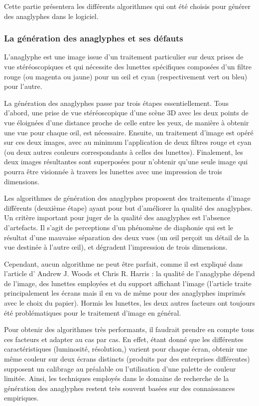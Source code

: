 Cette partie présentera les différents algorithmes qui ont été choisis pour générer des anaglyphes dans le logiciel.

\subsubsection{La génération des anaglyphes et ses défauts}
	L'anaglyphe est une image issue d'un traitement particulier sur deux prises de vue stéréoscopiques et qui nécessite des lunettes spécifiques composées d'un filtre rouge (ou magenta ou jaune) pour un \oe il et cyan (respectivement vert ou bleu) pour l'autre. 
	
	La génération des anaglyphes passe par trois étapes essentiellement. Tous d'abord, une prise de vue stéréoscopique d'une scène 3D avec les deux points de vue éloignées d'une distance proche de celle entre les yeux, de manière à obtenir une vue pour chaque \oe il, est nécessaire. Ensuite, un traitement d'image est opéré sur ces deux images, avec au minimum l'application de deux filtres rouge et cyan (ou deux autres couleurs correspondants à celles des lunettes). Finalement, les deux images résultantes sont superposées pour n'obtenir qu'une seule image qui pourra être visionnée à travers les lunettes avec une impression de trois dimensions.
	
	Les algorithmes de génération des anaglyphes proposent des traitements d'image différents (deuxième étape) ayant pour but d'améliorer la qualité des anaglyphes. Un critère important pour juger de la qualité des anaglyphes est l'absence d'artefacts. Il s'agit de perceptions d'un phénomène de diaphonie qui est le résultat d'une mauvaise séparation des deux vues (un \oe il perçoit un détail de la vue destinée à l'autre \oe il), et dégradent l'impression de trois dimensions. %

	Cependant, aucun algorithme ne peut être parfait, comme il est expliqué dans l'article d' Andrew J. Woods et Chris R. Harris \cite{anaglypheDefaut}  : la qualité de l'anaglyphe dépend de l'image, des lunettes employées et du support affichant l'image (l'article traite principalement les écrans mais il en va de même pour des anaglyphes imprimés avec le choix du papier). Hormis les lunettes, les deux autres facteurs ont toujours été problématiques pour le traitement d'image en général.  
	
	Pour obtenir des algorithmes très performants, il faudrait prendre en compte tous ces facteurs et adapter au cas par cas. En effet, étant donné que les différentes caractéristiques (luminosité, résolution,) varient pour chaque écran, obtenir une même couleur sur deux écrans distincts (produits par des entreprises différentes) supposent un calibrage au préalable ou l'utilisation d'une palette de couleur limitée. Ainsi, les techniques employés dans le domaine de recherche de la génération des anaglyphes restent très souvent basées sur des connaissances empiriques.
		
